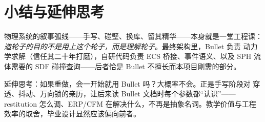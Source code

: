 \section{小结与延伸思考}

物理系统的叙事弧线——手写、碰壁、换库、留其精华——本身就是一堂工程课：
\emph{造轮子的目的不是用上这个轮子，而是理解轮子}。最终架构里，Bullet 负责
动力学求解（信任其二十年打磨），自研代码负责 ECS 桥接、事件语义、以及
SPH 流体需要的 SDF 碰撞查询——后者恰是 Bullet 不擅长而本项目刚需的部分。

延伸思考：如果重做，会一开始就用 Bullet 吗？大概率不会。正是手写阶段对
穿透、抖动、万向锁的亲历，让后来读 Bullet 文档时每个参数都``认识''——
restitution 怎么调、ERP/CFM 在解决什么，不再是抽象名词。教学价值与工程
效率的取舍，毕业设计显然应该偏向前者。
